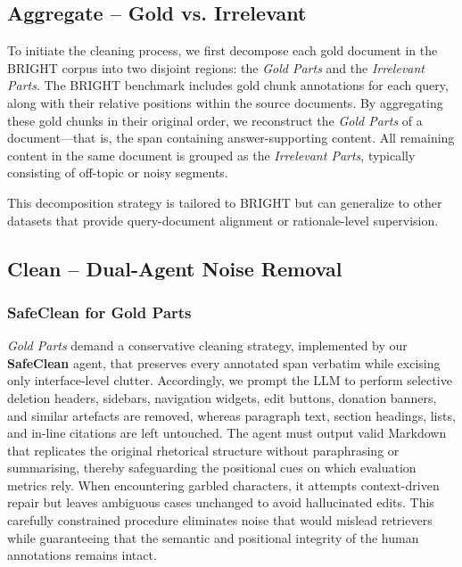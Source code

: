 \documentclass[11pt]{article}
\begin{document}
\subsection{Aggregate -- Gold vs. Irrelevant}
To initiate the cleaning process, we first decompose each gold document in the BRIGHT corpus into two disjoint regions: the \emph{Gold Parts} and the \emph{Irrelevant Parts}.  
The BRIGHT benchmark includes gold chunk annotations for each query, along with their relative positions within the source documents.  
By aggregating these gold chunks in their original order, we reconstruct the \emph{Gold Parts} of a document—that is, the span containing answer-supporting content.  
All remaining content in the same document is grouped as the \emph{Irrelevant Parts}, typically consisting of off-topic or noisy segments.

This decomposition strategy is tailored to BRIGHT but can generalize to other datasets that provide query-document alignment or rationale-level supervision. 



\subsection{Clean -- Dual-Agent Noise Removal}
\subsubsection{SafeClean for Gold Parts}
\emph{Gold Parts} demand a conservative cleaning strategy, implemented by our \textbf{SafeClean} agent, that preserves every annotated span verbatim while excising only interface-level clutter. 
Accordingly, we prompt the LLM to perform selective deletion headers, sidebars, navigation widgets, edit buttons, donation banners, and similar artefacts are removed, whereas paragraph text, section headings, lists, and in-line citations are left untouched.  
The agent must output valid Markdown that replicates the original rhetorical structure without paraphrasing or summarising, thereby safeguarding the positional cues on which evaluation metrics rely.  
When encountering garbled characters, it attempts context-driven repair but leaves ambiguous cases unchanged to avoid hallucinated edits.  
This carefully constrained procedure eliminates noise that would mislead retrievers while guaranteeing that the semantic and positional integrity of the human annotations remains intact.
\end{document}
